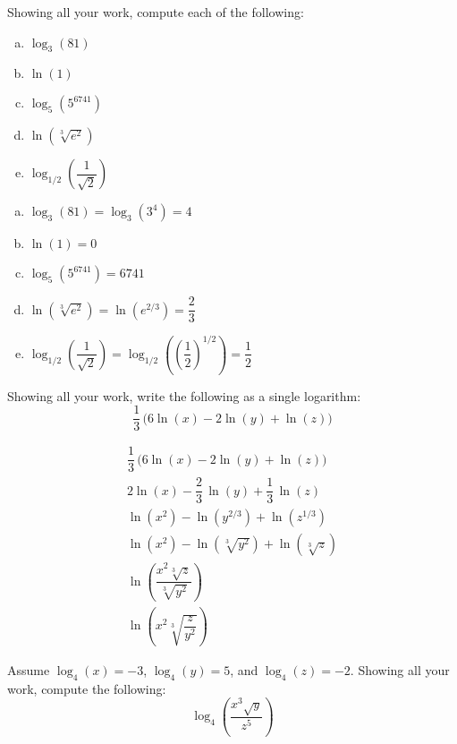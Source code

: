 \documentclass[12pt,letterpaper]{exam}
\begin{document}
\begin{questions}
\newpage
\question[10] Showing all your work, compute each of the following:
	\begin{enumerate}[(a)]
	\item $\log_3(81)$
	\item $\ln(1)$
	\item $\log_5(5^{6741})$
	\item $\ln(\sqrt[3]{e^2})$
	\item $\log_{1/2} \left( \dfrac{1}{\sqrt{2}} \right)$
	\end{enumerate} \pspace

{\itshape
{}
\begin{enumerate}[(a)]
\item $\log_3(81)= \log_3(3^4)= 4$ \pspace

\item $\ln(1)= 0$ \pspace

\item $\log_5(5^{6741})= 6741$ \pspace

\item $\ln(\sqrt[3]{e^2})= \ln(e^{2/3})= \dfrac{2}{3}$ \pspace

\item $\log_{1/2} \left( \dfrac{1}{\sqrt{2}} \right)= \log_{1/2} \left( \left( \dfrac{1}{2} \right)^{1/2} \right)= \dfrac{1}{2}$
\end{enumerate}
}



\newpage
\question[10] Showing all your work, write the following as a single logarithm:
	\[
	\dfrac{1}{3}\, \big( 6 \ln(x) - 2 \ln(y) + \ln(z) \big)
	\] \pspace

	\begin{gather*}
	\dfrac{1}{3}\, \big( 6 \ln(x) - 2 \ln(y) + \ln(z) \big) \\[0.3cm]
	2 \ln(x) - \dfrac{2}{3}\, \ln(y) + \dfrac{1}{3}\, \ln(z) \\[0.3cm]
	\ln(x^2) - \ln(y^{2/3}) + \ln(z^{1/3}) \\[0.3cm]
	\ln(x^2) - \ln(\sqrt[3]{y^2}) + \ln(\sqrt[3]{z}) \\[0.3cm]
	\ln \left( \dfrac{x^2 \sqrt[3]{z}}{\sqrt[3]{y^2}} \right) \\[0.3cm]
	\ln \left( x^2 \sqrt[3]{\dfrac{z}{y^2}} \right)
	\end{gather*}



\newpage
\question[10] Assume $\log_4(x)= -3$, $\log_4(y)= 5$, and $\log_4(z)= -2$. Showing all your work, compute the following:
	\[
	\log_4 \left( \dfrac{x^3 \sqrt{y}}{z^5} \right)
	\] \pspace
	

\end{questions}
\end{document}
